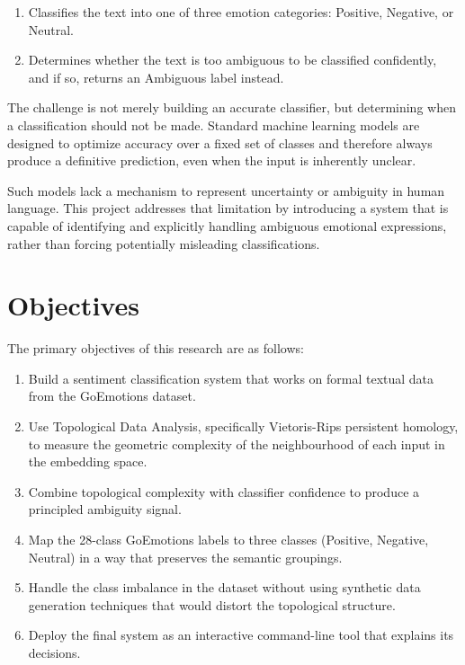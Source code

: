 \begin{enumerate}
    \item Classifies the text into one of three emotion categories: Positive, Negative, or
    Neutral.
    \item Determines whether the text is too ambiguous to be classified confidently, and if so,
    returns an Ambiguous label instead.
\end{enumerate}

The challenge is not merely building an accurate classifier, but determining when a
classification should not be made. Standard machine learning models are designed to optimize
accuracy over a fixed set of classes and therefore always produce a definitive prediction, even
when the input is inherently unclear.

Such models lack a mechanism to represent uncertainty or ambiguity in human language. This
project addresses that limitation by introducing a system that is capable of identifying and
explicitly handling ambiguous emotional expressions, rather than forcing potentially misleading
classifications.

\section{Objectives}

The primary objectives of this research are as follows:

\begin{enumerate}
    \item Build a sentiment classification system that works on formal textual data from
    the GoEmotions dataset.
    \item Use Topological Data Analysis, specifically Vietoris-Rips persistent homology, to
    measure the geometric complexity of the neighbourhood of each input in the embedding
    space.
    \item Combine topological complexity with classifier confidence to produce a principled
    ambiguity signal.
    \item Map the 28-class GoEmotions labels to three classes (Positive, Negative, Neutral)
    in a way that preserves the semantic groupings.
    \item Handle the class imbalance in the dataset without using synthetic data generation
    techniques that would distort the topological structure.
    \item Deploy the final system as an interactive command-line tool that explains its decisions.
\end{enumerate}

